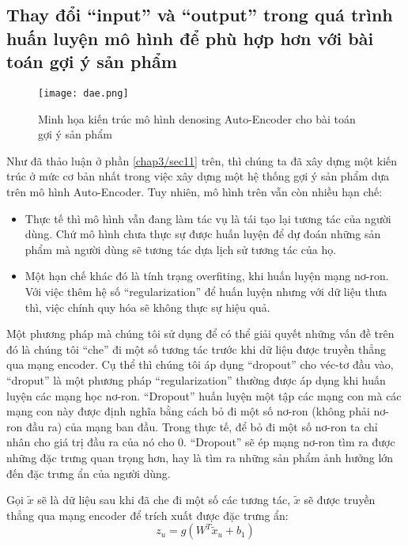     \subsection{Thay đổi ``input'' và ``output'' trong quá trình huấn luyện mô hình để phù hợp hơn với bài toán gợi ý sản phẩm}
    \label{DAE_recsys}
    \begin{figure}
        \centering
        \texttt{[image: dae.png]}
        \caption{Minh họa kiến trúc mô hình denosing Auto-Encoder cho bài toán gợi ý sản phẩm}
        \label{fig_recdae}
    \end{figure}
    Như đã thảo luận ở phần \ref{chap3/sec11} trên, thì chúng ta đã xây dựng một kiến trúc ở mức cơ bản nhất trong việc xây dựng một hệ thống gợi ý sản phẩm dựa trên mô hình Auto-Encoder.
    Tuy nhiên, mô hình trên vẫn còn nhiều hạn chế: 
    \begin{itemize}
        \item Thực tế thì mô hình vẫn đang làm tác vụ là tái tạo lại tương tác của người dùng. Chứ mô hình chưa thực sự được huấn luyện để dự đoán những sản phẩm mà người dùng sẽ tương tác dựa lịch sử tương tác của họ.
        \item Một hạn chế khác đó là tính trạng overfiting, khi huấn luyện mạng nơ-ron. Với việc thêm hệ số ``regularization'' để huấn luyện nhưng với dữ liệu thưa thì, việc chính quy hóa sẽ không thực sự hiệu quả.
    \end{itemize}
    
    Một phương pháp mà chúng tôi sử dụng để có thể giải quyết những vấn đề trên đó là chúng tôi ``che'' đi một số tương tác trước khi dữ liệu được truyền thẳng qua mạng encoder. 
    Cụ thể thì chúng tôi áp dụng ``dropout'' cho véc-tơ đầu vào, ``droput'' là một phương pháp ``regularization'' thường được áp dụng khi huấn luyện các mạng học nơ-ron.
    ``Dropout'' huấn luyện một tập các mạng con mà các mạng con này được định nghĩa bằng cách bỏ đi một số nơ-ron (không phải nơ-ron đầu ra) của mạng ban đầu. 
    Trong thực tế, để bỏ đi một số nơ-ron ta chỉ nhân cho giá trị đầu ra của nó cho 0. 
    ``Dropout'' sẽ ép mạng nơ-ron tìm ra được những đặc trưng quan trọng hơn, hay là tìm ra những sản phẩm ảnh hưởng lớn đến đặc trưng ẩn của người dùng. 
    
    Gọi $\tilde{x}$ sẽ là dữ liệu sau khi đã che đi một số các tương tác, $\tilde{x}$ sẽ được truyền thẳng qua mạng encoder để trích xuất được đặc trưng ẩn:
    \begin{equation}
        \label{z_u_with_x_tilde}
        z_u = g(W^T \tilde{x}_u + b_1)
    \end{equation}
    
